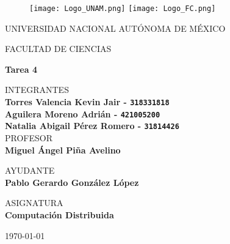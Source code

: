 \thispagestyle{empty}

\begin{figure}[ht]
  \texttt{[image: Logo\_UNAM.png]}
  \label{EscudoUNAM}
  \endminipage
  \texttt{[image: Logo\_FC.png]}
  \label{EscudoFC}
  \endminipage
\end{figure}

\begin{center}
  \vspace{0.8cm}
  \LARGE
  UNIVERSIDAD NACIONAL AUTÓNOMA DE MÉXICO 
  
  \vspace{0.7cm}
  \LARGE
  FACULTAD DE CIENCIAS
  
  \vspace{0.8 cm}	
  \Large
  \textbf{Tarea 4}

  \vspace{0.8 cm}
  \normalsize	
  INTEGRANTES \\
  \vspace{.2cm}
  \large
  \textbf{Torres Valencia Kevin Jair - \texttt{318331818}}\\
  \textbf{Aguilera Moreno Adrián - \texttt{421005200}}\\
  \textbf{Natalia Abigail Pérez Romero  - \texttt{31814426}}\\
  
  \vspace{1 cm}
  \normalsize	
  PROFESOR \\
  \vspace{.2cm}
  \large
  \textbf{Miguel Ángel Piña Avelino}
  
  \vspace{1 cm}
  AYUDANTE \\
  \vspace{.2cm}
  \large
  \textbf{Pablo Gerardo González López}
  \vspace{1.3cm}
  
  \normalsize	
  ASIGNATURA \\
  \vspace{.2cm}
  \large
  \textbf{Computación Distribuida}
  
  \vspace{1 cm}
  \today
\end{center}

